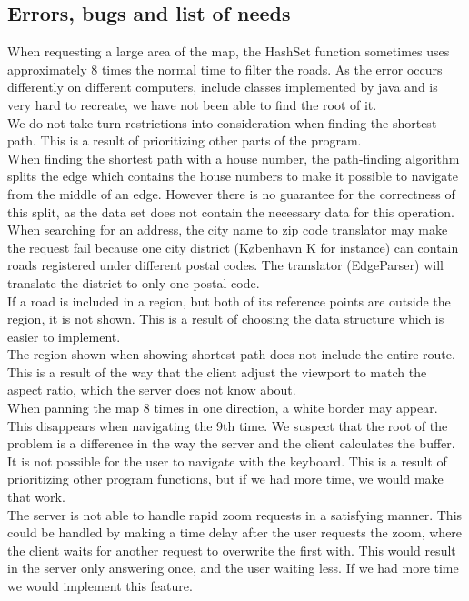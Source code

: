 \documentclass[a4paper,10pt,titlepage]{article}
\begin{document}
		\subsection{Errors, bugs and list of needs}
When requesting a large area of the map, the HashSet function sometimes uses approximately 8 times the normal time to filter the roads. As the error occurs differently on different computers, include classes implemented by java and is very hard to recreate, we have not been able to find the root of it.
\\
We do not take turn restrictions into consideration when finding the shortest path. This is a result of prioritizing other parts of the program.
\\
When finding the shortest path with a house number, the path-finding algorithm splits the edge which contains the house numbers to make it possible to navigate from the middle of an edge. However there is no guarantee for the correctness of this split, as the data set does not contain the necessary data for this operation.
\\
When searching for an address, the city name to zip code translator may make the request fail because one city district (København K for instance) can contain roads registered under different postal codes. The translator (EdgeParser) will translate the district to only one postal code.
\\
If a road is included in a region, but both of its reference points are outside the region, it is not shown. This is a result of choosing the data structure which is easier to implement.
\\
The region shown when showing shortest path does not include the entire route. This is a result of the way that the client adjust the viewport to match the aspect ratio, which the server does not know about.
\\
When panning the map 8 times in one direction, a white border may appear. This disappears when navigating the 9th time. We suspect that the root of the problem is a difference in the way the server and the client calculates the buffer.
\\
It is not possible for the user to navigate with the keyboard. This is a result of prioritizing other program functions, but if we had more time, we would make that work.
\\
The server is not able to handle rapid zoom requests in a satisfying manner. This could be handled by making a time delay after the user requests the zoom, where the client waits for another request to overwrite the first with. This would result in the server only answering once, and the user waiting less. If we had more time we would implement this feature.
\\
\end{document}

